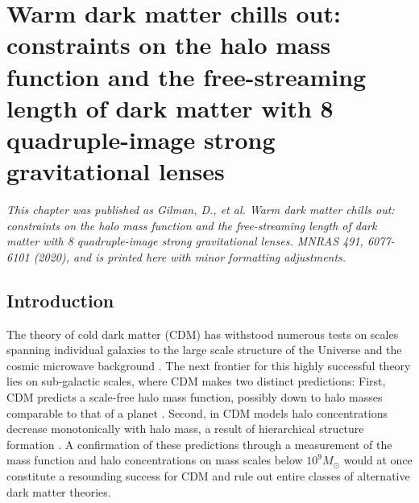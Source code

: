 \def\rein{{$R_{\rm{Ein}}$}}
\def\cmg{{\rm{$\rm{cm}^2 \rm{g}^{-1}$}}}
\def\msun{{M_{\odot}}}
\def\sigmasidm{{$\sigma_{\rm{SIDM}}$}}
\def\dlos{{\delta_{\rm{los}}}}
\def\mhm{{m_{\rm{hm}}}}

\def\data{{\bf{d}_{\rm{n}}}}
\def\datasim{{\bf{d}_{\rm{n}}^{\prime}}}
\def\msub{{\bf{m}_{\rm{sub}}}}
\def\qsub{{\bf{q}_{\rm{s}}}}
\def\fsub{{{f}_{\rm{sub}}}}
\def\fsubmean{{\bar{f}_{\rm{sub}}}}
\def\qmac{{\bf{M}}}
\def\qm{{}{\bf{M}}}
\def\sigmasubmean{0.035 \rm{kpc^{-2}}}
\def\sigmasubonesigma{0.025 < \Sigma_{\rm{sub}} < 0.05 \rm{kpc^{-2}}}
\def\sigmasubtwosigma{0.01 < \Sigma_{\rm{sub}} < 0.075 \rm{kpc^{-2}}}
\def\msubmean{3.9 \times 10^7 \msun \rm{kpc^{-2}}}
\def\msubonesigmalow{2.8 \times 10^7 \msun \rm{kpc^{-2}}}
\def\msubonesigmahigh{5.8 \times 10^7 \msun \rm{kpc^{-2}}}
\def\msubtwosigmalow{1.1 \times 10^7 \msun \rm{kpc^{-2}}}
\def\msubtwosigmalow{8.3 \times 10^7 \msun \rm{kpc^{-2}}}

\def\vspacing{\\[0.15cm]}

\chapter{Warm dark matter chills out: constraints on the halo mass function and the free-streaming length of dark matter with 8 quadruple-image strong gravitational lenses}
\textit{This chapter was published as Gilman, D., et al. Warm dark matter chills out: constraints on the halo mass function and the free-streaming length of dark matter with 8 quadruple-image strong gravitational lenses. MNRAS 491, 6077-6101 (2020), and is printed here with minor formatting adjustments.}
	
\section{Introduction}
The theory of cold dark matter (CDM) has withstood numerous tests on scales spanning individual galaxies to the large scale structure of the Universe and the cosmic microwave background \citep{Tegmark++04,deBlok++08,WMAP9cosmo}. The next frontier for this highly successful theory lies on sub-galactic scales, where CDM makes two distinct predictions: First, CDM predicts a scale-free halo mass function, possibly down to halo masses comparable to that of a planet \citep{Hofmann++01,Angulo++17}. Second, in CDM models halo concentrations decrease monotonically with halo mass, a result of hierarchical structure formation \citep{Moore++99,AvilaReese++01,Zhao++03,DiemerJoyce18}. A confirmation of these predictions through a measurement of the mass function and halo concentrations on mass scales below $10^9 \msun$ would at once constitute a resounding success for CDM and rule out entire classes of alternative dark matter theories. 

